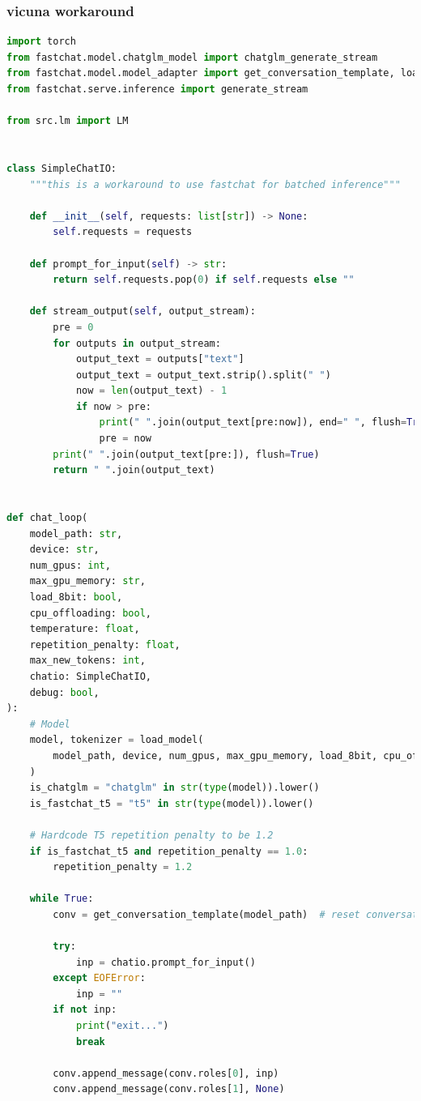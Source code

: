 \documentclass[a4paper,12pt]{article}
\begin{document}
\subsubsection{vicuna workaround}
\label{ann:vicuna}
\begin{lstlisting}[language=Python]
import torch
from fastchat.model.chatglm_model import chatglm_generate_stream
from fastchat.model.model_adapter import get_conversation_template, load_model
from fastchat.serve.inference import generate_stream

from src.lm import LM


class SimpleChatIO:
    """this is a workaround to use fastchat for batched inference"""

    def __init__(self, requests: list[str]) -> None:
        self.requests = requests

    def prompt_for_input(self) -> str:
        return self.requests.pop(0) if self.requests else ""

    def stream_output(self, output_stream):
        pre = 0
        for outputs in output_stream:
            output_text = outputs["text"]
            output_text = output_text.strip().split(" ")
            now = len(output_text) - 1
            if now > pre:
                print(" ".join(output_text[pre:now]), end=" ", flush=True)
                pre = now
        print(" ".join(output_text[pre:]), flush=True)
        return " ".join(output_text)


def chat_loop(
    model_path: str,
    device: str,
    num_gpus: int,
    max_gpu_memory: str,
    load_8bit: bool,
    cpu_offloading: bool,
    temperature: float,
    repetition_penalty: float,
    max_new_tokens: int,
    chatio: SimpleChatIO,
    debug: bool,
):
    # Model
    model, tokenizer = load_model(
        model_path, device, num_gpus, max_gpu_memory, load_8bit, cpu_offloading, debug
    )
    is_chatglm = "chatglm" in str(type(model)).lower()
    is_fastchat_t5 = "t5" in str(type(model)).lower()

    # Hardcode T5 repetition penalty to be 1.2
    if is_fastchat_t5 and repetition_penalty == 1.0:
        repetition_penalty = 1.2

    while True:
        conv = get_conversation_template(model_path)  # reset conversation

        try:
            inp = chatio.prompt_for_input()
        except EOFError:
            inp = ""
        if not inp:
            print("exit...")
            break

        conv.append_message(conv.roles[0], inp)
        conv.append_message(conv.roles[1], None)


\end{lstlisting}
\end{document}
